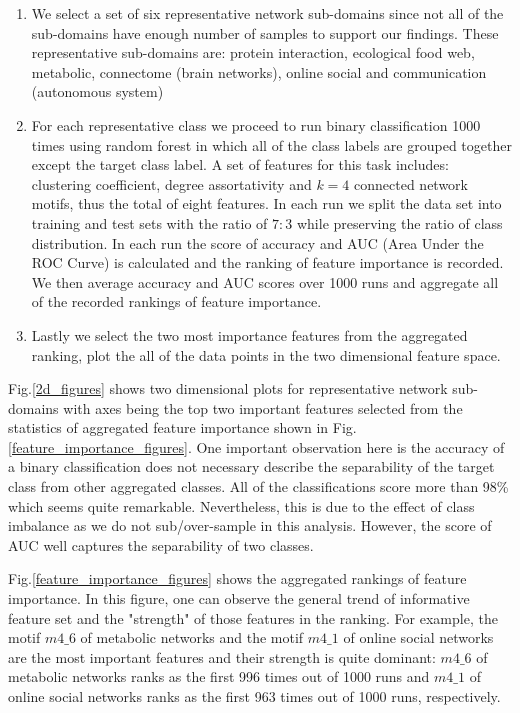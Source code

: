 \documentclass{article}
\begin{document}
\begin{enumerate}
	\item We select a set of six representative network sub-domains since not all of the sub-domains have enough number of samples to support our findings. These representative sub-domains are: protein interaction, ecological food web, metabolic, connectome (brain networks),  online social and communication (autonomous system)
	\item For each representative class we proceed to run binary classification 1000 times using random forest in which all of the class labels are grouped together except the target class label. A set of features for this task includes: clustering coefficient, degree assortativity and $k = 4$ connected network motifs, thus the total of eight features. In each run we split the data set into training and test sets with the ratio of $7:3$ while preserving the ratio of class distribution. In each run the score of accuracy and AUC (Area Under the ROC Curve) is calculated and the ranking of feature importance is recorded. We then average accuracy and AUC scores over 1000 runs and aggregate all of the recorded rankings of feature importance.
	\item Lastly we select the two most importance features from the aggregated ranking, plot the all of the data points in the two dimensional feature space.
\end{enumerate}

Fig.\ref{2d_figures} shows two dimensional plots for representative network sub-domains with axes being the top two important features selected from the statistics of aggregated feature importance shown in Fig. \ref{feature_importance_figures}. One important observation here is the accuracy of a binary classification does not necessary describe the separability of the target class from other aggregated classes. All of the classifications score more than 98\% which seems quite remarkable. Nevertheless, this is due to the effect of class imbalance as we do not sub/over-sample in this analysis. However, the score of AUC well captures the separability of two classes. 

Fig.\ref{feature_importance_figures} shows the aggregated rankings of feature importance. In this figure, one can observe the general trend of informative feature set and the "strength" of those features in the ranking. For example, the motif $m4\_6$ of metabolic networks and the motif $m4\_1$ of online social networks are the most important features and their strength is quite dominant:  $m4\_6$ of metabolic networks ranks as the first 996 times out of 1000 runs and $m4\_1$ of online social networks ranks as the first 963 times  out of 1000 runs, respectively.
\end{document}
